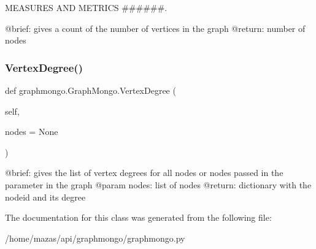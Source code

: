 M\+E\+A\+S\+U\+R\+ES A\+ND M\+E\+T\+R\+I\+CS \#\#\#\#\#\#. 

\begin{DoxyVerb}@brief: gives a count of the number of vertices in the graph
@return: number of nodes
\end{DoxyVerb}
 \hypertarget{classgraphmongo_1_1GraphMongo_a81f03a7b13d6f27cb959efcd9e16e7eb}{}\label{classgraphmongo_1_1GraphMongo_a81f03a7b13d6f27cb959efcd9e16e7eb} 
\subsubsection{\texorpdfstring{Vertex\+Degree()}{VertexDegree()}}
{\footnotesize\ttfamily def graphmongo.\+Graph\+Mongo.\+Vertex\+Degree (\begin{DoxyParamCaption}\item[{}]{self,  }\item[{}]{nodes = {\ttfamily None} }\end{DoxyParamCaption})}

\begin{DoxyVerb}@brief: gives the list of vertex degrees for all nodes or nodes passed in the parameter in the graph
@param nodes: list of nodes
@return: dictionary with the nodeid and its degree
\end{DoxyVerb}
 

The documentation for this class was generated from the following file\+:\begin{DoxyCompactItemize}
\item 
/home/mazas/api/graphmongo/graphmongo.\+py\end{DoxyCompactItemize}

